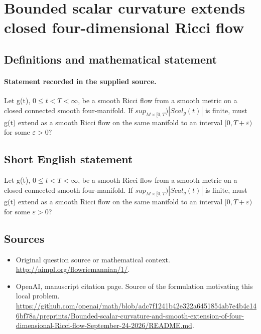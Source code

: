 \documentclass[11pt]{article}
\begin{document}
\section*{Bounded scalar curvature extends closed four-dimensional Ricci flow}\label{statement}
\subsection{Definitions and mathematical statement}
\paragraph{Statement recorded in the supplied source.}
Let g(t), $0\leq t<T<\infty $, be a smooth Ricci flow from a smooth metric on a closed connected smooth four-manifold. If $sup_{M×[0,T})|Scal_g(t)|$ is finite, must g(t) extend as a smooth Ricci flow on the same manifold to an interval $[0,T+\varepsilon )$ for some $\varepsilon >0$?
\subsection{Short English statement}
Let g(t), $0\leq t<T<\infty $, be a smooth Ricci flow from a smooth metric on a closed connected smooth four-manifold. If $sup_{M×[0,T})|Scal_g(t)|$ is finite, must g(t) extend as a smooth Ricci flow on the same manifold to an interval $[0,T+\varepsilon )$ for some $\varepsilon >0$?
\subsection{Sources}
\begin{itemize}
\item[S1] Original question source or mathematical context.
\url{http://aimpl.org/flowriemannian/1/}.
\item[S2] OpenAI, manuscript citation page. Source of the formulation motivating this local problem.
\url{https://github.com/openai/math/blob/adc7f1241b42e322a6451854ab7e4b4c146bf78a/preprints/Bounded-scalar-curvature-and-smooth-extension-of-four-dimensional-Ricci-flow-September-24-2026/README.md}.
\end{itemize}
\end{document}
